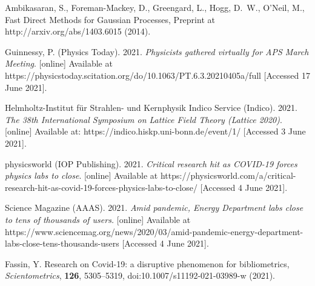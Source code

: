 \documentclass[a4paper,12pt]{article}
\begin{document}
\begin{thebibliography}{10}
{Ambikasaran, S., Foreman-Mackey, D., Greengard, L., Hogg, D.~W., O'Neil, M.,}
{Fast Direct Methods for Gaussian Processes}, Preprint at http://arxiv.org/abs/1403.6015 \newblock (2014).

Guinnessy, P. (Physics Today). 2021. \emph{Physicists gathered virtually for APS March Meeting}. [online] Available at {https://physicstoday.scitation.org/do/10.1063/PT.6.3.20210405a/full} [Accessed 17 June 2021].
 
Helmholtz-Institut f\"ur Strahlen- und Kernphysik Indico Service (Indico). 2021. \emph{The 38th International Symposium on Lattice Field Theory (Lattice 2020)}. [online] Available at: {https://indico.hiskp.uni-bonn.de/event/1/} [Accessed 3 June 2021].

physicsworld (IOP Publishing). 2021. \emph{Critical research hit as COVID-19 forces physics labs to close}. [online] Available at {https://physicsworld.com/a/critical-research-hit-as-covid-19-forces-physics-labs-to-close/} [Accessed 4 June 2021].


Science Magazine (AAAS). 2021. \emph{Amid pandemic, Energy Department labs close to tens of thousands of users.} [online] Available at {https://www.sciencemag.org/news/2020/03/amid-pandemic-energy-department-labs-close-tens-thousands-users} [Accessed 4 June 2021].

{Fassin, Y.} {Research on Covid-19: a disruptive phenomenon for bibliometrics}, \emph{Scientometrics}, \textbf{126}, 5305--5319, doi:10.1007/s11192-021-03989-w \newblock (2021).

\end{thebibliography}

\newpage
\end{document}
